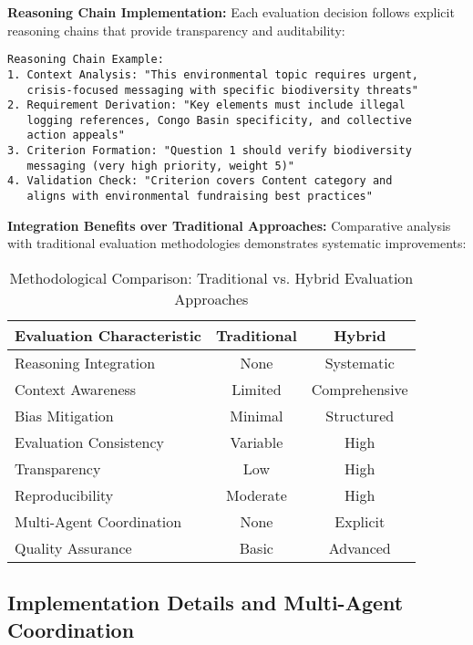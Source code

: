 \textbf{Reasoning Chain Implementation:}
Each evaluation decision follows explicit reasoning chains that provide transparency and auditability:

\begin{verbatim}
Reasoning Chain Example:
1. Context Analysis: "This environmental topic requires urgent, 
   crisis-focused messaging with specific biodiversity threats"
2. Requirement Derivation: "Key elements must include illegal 
   logging references, Congo Basin specificity, and collective 
   action appeals"
3. Criterion Formation: "Question 1 should verify biodiversity 
   messaging (very high priority, weight 5)"
4. Validation Check: "Criterion covers Content category and 
   aligns with environmental fundraising best practices"
\end{verbatim}

\textbf{Integration Benefits over Traditional Approaches:}
Comparative analysis with traditional evaluation methodologies demonstrates systematic improvements:

\begin{table}[H]
\centering
\caption[Traditional vs. Hybrid Evaluation Comparison]{Methodological Comparison: Traditional vs. Hybrid Evaluation Approaches}
\label{tab:traditional-vs-hybrid-comparison}
\begin{tabular}{lcc}
\toprule
\textbf{Evaluation Characteristic} & \textbf{Traditional} & \textbf{Hybrid} \\
\midrule
Reasoning Integration & None & Systematic \\
Context Awareness & Limited & Comprehensive \\
Bias Mitigation & Minimal & Structured \\
Evaluation Consistency & Variable & High \\
Transparency & Low & High \\
Reproducibility & Moderate & High \\
Multi-Agent Coordination & None & Explicit \\
Quality Assurance & Basic & Advanced \\
\bottomrule
\end{tabular}
\end{table}

\subsection{Implementation Details and Multi-Agent Coordination}
\label{subsec:implementation-details-coordination}

